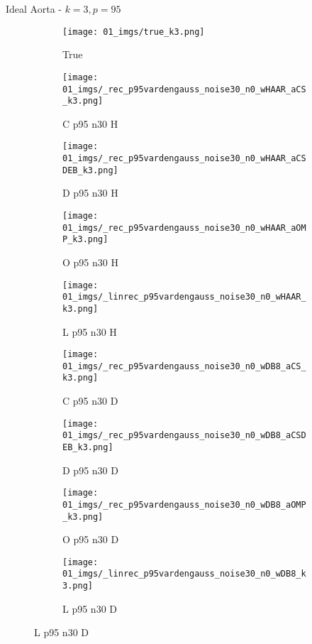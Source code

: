 \begin{frame}{Ideal Aorta - $k=3,p=95$}{}
\begin{figure}
\begin{subfigure}{0.1\textwidth}
\texttt{[image: 01\_imgs/true\_k3.png]}
\caption*{\Tiny True}
\end{subfigure}
\begin{subfigure}{0.1\textwidth}
\texttt{[image: 01\_imgs/\_rec\_p95vardengauss\_noise30\_n0\_wHAAR\_aCS\_k3.png]}
\caption*{\Tiny C p95 n30 H}
\end{subfigure}
\begin{subfigure}{0.1\textwidth}
\texttt{[image: 01\_imgs/\_rec\_p95vardengauss\_noise30\_n0\_wHAAR\_aCSDEB\_k3.png]}
\caption*{\Tiny D p95 n30 H}
\end{subfigure}
\begin{subfigure}{0.1\textwidth}
\texttt{[image: 01\_imgs/\_rec\_p95vardengauss\_noise30\_n0\_wHAAR\_aOMP\_k3.png]}
\caption*{\Tiny O p95 n30 H}
\end{subfigure}
\begin{subfigure}{0.1\textwidth}
\texttt{[image: 01\_imgs/\_linrec\_p95vardengauss\_noise30\_n0\_wHAAR\_k3.png]}
\caption*{\Tiny L p95 n30 H}
\end{subfigure}
\begin{subfigure}{0.1\textwidth}
\texttt{[image: 01\_imgs/\_rec\_p95vardengauss\_noise30\_n0\_wDB8\_aCS\_k3.png]}
\caption*{\Tiny C p95 n30 D}
\end{subfigure}
\begin{subfigure}{0.1\textwidth}
\texttt{[image: 01\_imgs/\_rec\_p95vardengauss\_noise30\_n0\_wDB8\_aCSDEB\_k3.png]}
\caption*{\Tiny D p95 n30 D}
\end{subfigure}
\begin{subfigure}{0.1\textwidth}
\texttt{[image: 01\_imgs/\_rec\_p95vardengauss\_noise30\_n0\_wDB8\_aOMP\_k3.png]}
\caption*{\Tiny O p95 n30 D}
\end{subfigure}
\begin{subfigure}{0.1\textwidth}
\texttt{[image: 01\_imgs/\_linrec\_p95vardengauss\_noise30\_n0\_wDB8\_k3.png]}
\caption*{\Tiny L p95 n30 D}
\end{subfigure}
\end{figure}
\end{frame}


